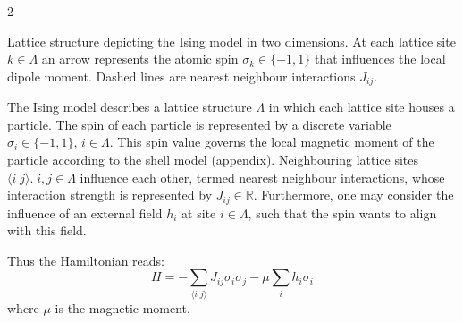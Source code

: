 \documentclass [10pt]{article}
\newcommand {\qeval}[1] {\langle #1 \rangle}
\begin{document}
\begin {multicols}{2}
\vspace {0.3cm}
\begin {center}

	{
	Lattice structure depicting the Ising model in two dimensions. At each
	lattice site $k \in \Lambda$ an arrow represents the atomic spin
	$\sigma_k \in \{-1, 1\}$ that influences the local dipole moment. Dashed
	lines are nearest neighbour interactions $J_{ij}$.
}
\end {center}
\vspace {0.3cm}

The Ising model describes a lattice structure $\Lambda$ in which each lattice
site houses a particle. The spin of each particle is represented by a discrete
variable $\sigma_i \in \{-1, 1\}$, $i \in \Lambda$. This spin value governs the
local magnetic moment of the particle according to the shell model (appendix).
Neighbouring lattice sites $\qeval{i\;j}. \; i, j \in \Lambda$ influence each
other, termed nearest neighbour interactions, whose interaction strength is
represented by $J_{ij} \in \mathbb R$. Furthermore, one may consider the
influence of an external field $h_i$ at site $i \in \Lambda$, such that the
spin wants to align with this field.

Thus the Hamiltonian reads:
\begin {equation}
H = - \sum_{\qeval{i\;j}} J_{ij} \sigma_i \sigma_j - \mu \sum_{i} h_i \sigma_i
\end {equation}
where $\mu$ is the magnetic moment.


\end{multicols}
\end{document}
